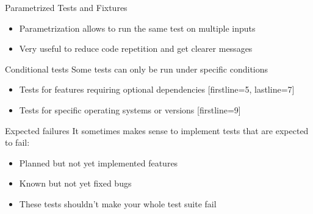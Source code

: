 \documentclass[
  aspectratio=1610,
]{beamer}
\begin{document}
\begin{frame}[c]{Parametrized Tests and Fixtures}
  \begin{itemize}
    \item Parametrization allows to run the same test on multiple inputs
    \item Very useful to reduce code repetition and get clearer messages
  \end{itemize}

\end{frame}


\begin{frame}[c, fragile]{Conditional tests}
  Some tests can only be run under specific conditions
    \begin{itemize}
      \item Tests for features requiring optional dependencies
        [firstline=5, lastline=7]
      \item Tests for specific operating systems or versions
        [firstline=9]
    \end{itemize}
\end{frame}

\begin{frame}[c, fragile]{Expected failures}
  It sometimes makes sense to implement tests that are expected to fail:
  \begin{itemize}
    \item Planned but not yet implemented features
    \item Known but not yet fixed bugs
    \item These tests shouldn't make your whole test suite fail
  \end{itemize}

\end{frame}
\end{document}
